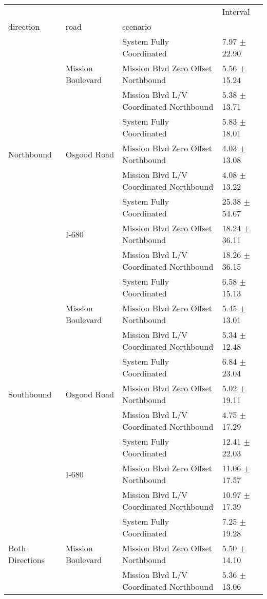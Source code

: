 \begin{tabular}{llll}
\toprule
 &  &  & Interval \\
direction & road & scenario &  \\
\midrule
\multirow[t]{9}{*}{Northbound} & \multirow[t]{3}{*}{Mission Boulevard} & System Fully Coordinated & 7.97 $\pm$ 22.90 \\
 &  & Mission Blvd Zero Offset Northbound & 5.56 $\pm$ 15.24 \\
 &  & Mission Blvd L/V Coordinated Northbound & 5.38 $\pm$ 13.71 \\
 & \multirow[t]{3}{*}{Osgood Road} & System Fully Coordinated & 5.83 $\pm$ 18.01 \\
 &  & Mission Blvd Zero Offset Northbound & 4.03 $\pm$ 13.08 \\
 &  & Mission Blvd L/V Coordinated Northbound & 4.08 $\pm$ 13.22 \\
 & \multirow[t]{3}{*}{I-680} & System Fully Coordinated & 25.38 $\pm$ 54.67 \\
 &  & Mission Blvd Zero Offset Northbound & 18.24 $\pm$ 36.11 \\
 &  & Mission Blvd L/V Coordinated Northbound & 18.26 $\pm$ 36.15 \\
\multirow[t]{9}{*}{Southbound} & \multirow[t]{3}{*}{Mission Boulevard} & System Fully Coordinated & 6.58 $\pm$ 15.13 \\
 &  & Mission Blvd Zero Offset Northbound & 5.45 $\pm$ 13.01 \\
 &  & Mission Blvd L/V Coordinated Northbound & 5.34 $\pm$ 12.48 \\
 & \multirow[t]{3}{*}{Osgood Road} & System Fully Coordinated & 6.84 $\pm$ 23.04 \\
 &  & Mission Blvd Zero Offset Northbound & 5.02 $\pm$ 19.11 \\
 &  & Mission Blvd L/V Coordinated Northbound & 4.75 $\pm$ 17.29 \\
 & \multirow[t]{3}{*}{I-680} & System Fully Coordinated & 12.41 $\pm$ 22.03 \\
 &  & Mission Blvd Zero Offset Northbound & 11.06 $\pm$ 17.57 \\
 &  & Mission Blvd L/V Coordinated Northbound & 10.97 $\pm$ 17.39 \\
\multirow[t]{9}{*}{Both Directions} & \multirow[t]{3}{*}{Mission Boulevard} & System Fully Coordinated & 7.25 $\pm$ 19.28 \\
 &  & Mission Blvd Zero Offset Northbound & 5.50 $\pm$ 14.10 \\
 &  & Mission Blvd L/V Coordinated Northbound & 5.36 $\pm$ 13.06 \\

\end{tabular}
